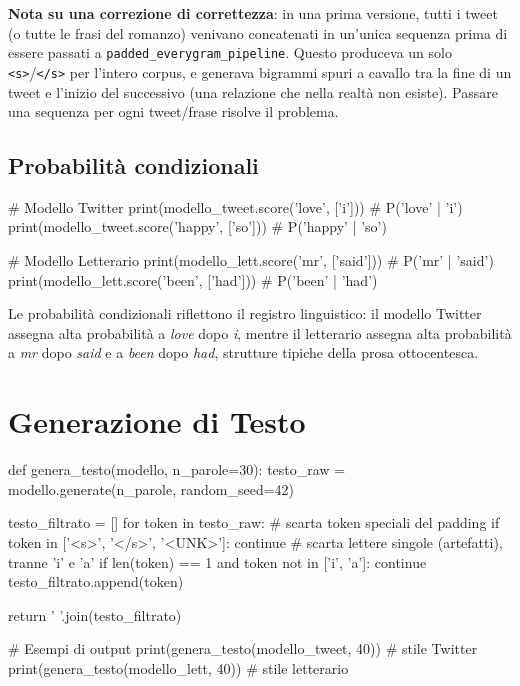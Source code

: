 ﻿\documentclass[12pt,a4paper]{article}
\begin{document}
\textbf{Nota su una correzione di correttezza}: in una prima versione, tutti i tweet (o tutte le frasi del romanzo) venivano concatenati in un'unica sequenza prima di essere passati a \texttt{padded\_everygram\_pipeline}. Questo produceva un solo \texttt{<s>}/\texttt{</s>} per l'intero corpus, e generava bigrammi spuri a cavallo tra la fine di un tweet e l'inizio del successivo (una relazione che nella realtà non esiste). Passare una sequenza per ogni tweet/frase risolve il problema.

\subsection{Probabilità condizionali}

\begin{pylisting}[title={Calcolo probabilità condizionali con MLE}]
# Modello Twitter
print(modello_tweet.score('love',  ['i']))    # P('love' | 'i')
print(modello_tweet.score('happy', ['so']))   # P('happy' | 'so')

# Modello Letterario
print(modello_lett.score('mr',   ['said']))   # P('mr' | 'said')
print(modello_lett.score('been', ['had']))    # P('been' | 'had')
\end{pylisting}

Le probabilità condizionali riflettono il registro linguistico: il modello Twitter assegna alta probabilità a \textit{love} dopo \textit{i}, mentre il letterario assegna alta probabilità a \textit{mr} dopo \textit{said} e a \textit{been} dopo \textit{had}, strutture tipiche della prosa ottocentesca.

\section{Generazione di Testo}

\begin{pylisting}[title={Generazione di testo con filtraggio degli artefatti}]
def genera_testo(modello, n_parole=30):
    testo_raw = modello.generate(n_parole, random_seed=42)

    testo_filtrato = []
    for token in testo_raw:
        # scarta token speciali del padding
        if token in ['<s>', '</s>', '<UNK>']:
            continue
        # scarta lettere singole (artefatti), tranne 'i' e 'a'
        if len(token) == 1 and token not in ['i', 'a']:
            continue
        testo_filtrato.append(token)

    return ' '.join(testo_filtrato)

# Esempi di output
print(genera_testo(modello_tweet, 40))   # stile Twitter
print(genera_testo(modello_lett,  40))   # stile letterario
\end{pylisting}
\end{document}
